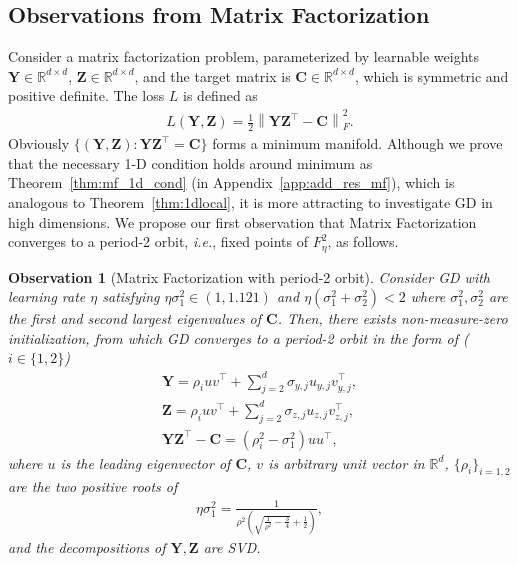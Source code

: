 \documentclass{article}
\theoremstyle{plain}
\newtheorem{obs}{Observation}
\theoremstyle{remark}
\newcommand{\norm}[1]{\left\lVert#1\right\rVert}
\def\R{\mathbb{R}}
\def\bC{\mathbf{C}}
\def\bY{\mathbf{Y}}
\def\bZ{\mathbf{Z}}
\newcommand{\cbb}[1]{\noindent{\color{blue}{#1}}}  %
\begin{document}
\subsection{Observations from Matrix Factorization}


Consider a matrix factorization problem, parameterized by learnable weights $\mathbf{Y}\in\R^{d\times d}$, $\mathbf{Z}\in\R^{d\times d}$, and the target matrix is $\mathbf{C}\in\R^{d\times d}$, which is symmetric and positive definite. The loss $L$ is defined as
\begin{align}
    L(\bY,\bZ)=\frac{1}{2}\norm{\bY\bZ^\top - \mathbf{C}}_F^2.
\end{align}
Obviously $\{(\bY,\bZ):\bY\bZ^\top=\mathbf{C}\}$ forms a minimum manifold. 
Although we prove that the necessary 1-D condition holds around minimum as Theorem~\ref{thm:mf_1d_cond} (in Appendix~\ref{app:add_res_mf}), which is analogous to Theorem~\ref{thm:1dlocal}, it is more attracting to investigate GD in high dimensions.
We propose our first observation that Matrix Factorization converges to a period-2 orbit, \textit{i.e.}, fixed points of $F^2_\eta$, as follows.


\begin{obs}[Matrix Factorization with period-2 orbit]
\label{obs:generic_mf}
Consider GD with learning rate $\eta$ satisfying $\eta\sigma_1^2\in(1,1.121)$ and $\eta\left(\sigma_1^2+\sigma_2^2\right)<2$ where $\sigma_1^2,\sigma_2^2$ are the first and second largest eigenvalues of $\bC$. Then, there exists non-measure-zero initialization, from which GD converges to a period-2 orbit in the form of ($i\in\{1,2\}$)
\begin{align*}
    \bY = \rho_i u v^\top + \sum_{j=2}^d \sigma_{y,j} u_{y,j} v_{y,j}^\top, \\
    \bZ = \rho_i u v^\top + \sum_{j=2}^d \sigma_{z,j} u_{z,j} v_{z,j}^\top, \\
    \bY\bZ^\top - \bC = (\rho_i^2-\sigma_1^2) u u^\top,
\end{align*}
where $u$ is the leading eigenvector of $\bC$, $v$ is arbitrary unit vector in $\R^d$, $\{\rho_i\}_{i=1,2}$ are the two positive roots of 
\begin{align}
    \eta\sigma_1^2 = \frac{1}{\rho^2 \left(\sqrt{\frac{1}{\rho^2}-\frac{3}{4}}+\frac{1}{2} \right)},
    \label{eq:rho}
\end{align}
and the decompositions of $\bY,\bZ$ are SVD.
\end{obs}
\end{document}
